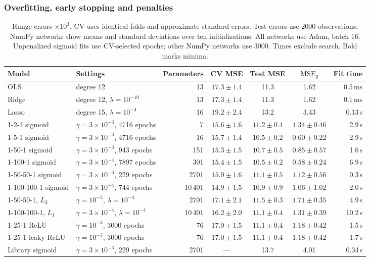 \documentclass[aps,prb,reprint,superscriptaddress,nofootinbib,longbibliography,floatfix]{revtex4-2}
\newcommand{\Mf}{\mathrm{MSE}_{g}}
\begin{document}
\subsubsection{Overfitting, early stopping and penalties}\label{sec:res_penalty}
\begin{table}[!tbp]
\footnotesize
\setlength{\tabcolsep}{4pt}
\centering
\caption{Runge errors $\times10^3$. CV uses identical folds and approximate standard errors. Test errors use 2000 observations; NumPy networks show means and standard deviations over ten initializations. All networks use Adam, batch 16. Unpenalized sigmoid fits use CV-selected epochs; other NumPy networks use 3000. Times exclude search. Bold marks minima.}\label{tab:runge}
\begin{ruledtabular}
\begin{tabular}{llrcccr}
Model & Settings & Parameters & CV MSE & Test MSE & $\Mf$ & Fit time \\ \hline
OLS & degree 12 & 13 & $17.3\pm1.4$ & 11.3 & 1.62 & 0.5\,ms \\
Ridge & degree 12, $\lambda=10^{-10}$ & 13 & $17.3\pm1.4$ & 11.3 & 1.62 & 0.1\,ms \\
Lasso & degree 15, $\lambda=10^{-4}$ & 16 & $19.2\pm2.4$ & 13.2 & 3.43 & 0.13\,s \\[2pt]
1-2-1 sigmoid & $\gamma=3\times10^{-3}$, 4716 epochs & 7 & $15.6\pm1.6$ & $11.2\pm0.4$ & $1.34\pm0.46$ & 2.9\,s \\
1-5-1 sigmoid & $\gamma=3\times10^{-3}$, 4716 epochs & 16 & $15.7\pm1.4$ & $10.5\pm0.2$ & $0.60\pm0.22$ & 2.9\,s \\
1-50-1 sigmoid & $\gamma=3\times10^{-3}$, 943 epochs & 151 & $15.3\pm1.5$ & $10.7\pm0.5$ & $0.85\pm0.57$ & 1.6\,s \\
1-100-1 sigmoid & $\gamma=3\times10^{-4}$, 7897 epochs & 301 & $15.4\pm1.5$ & $\bm{10.5\pm0.2}$ & $\bm{0.58\pm0.24}$ & 6.9\,s \\
1-50-50-1 sigmoid & $\gamma=3\times10^{-3}$, 229 epochs & 2701 & $15.0\pm1.6$ & $11.1\pm0.5$ & $1.12\pm0.56$ & 0.3\,s \\
1-100-100-1 sigmoid & $\gamma=3\times10^{-4}$, 744 epochs & 10\,401 & $\bm{14.9\pm1.5}$ & $10.9\pm0.9$ & $1.06\pm1.02$ & 2.0\,s \\
1-50-50-1, $L_2$ & $\gamma=10^{-3}$, $\lambda=10^{-4}$ & 2701 & $17.1\pm2.1$ & $11.5\pm0.3$ & $1.71\pm0.35$ & 4.9\,s \\
1-100-100-1, $L_1$ & $\gamma=3\times10^{-4}$, $\lambda=10^{-4}$ & 10\,401 & $16.2\pm2.0$ & $11.1\pm0.4$ & $1.31\pm0.39$ & 10.2\,s \\
1-25-1 ReLU & $\gamma=10^{-3}$, 3000 epochs & 76 & $17.0\pm1.5$ & $11.1\pm0.4$ & $1.18\pm0.42$ & 1.5\,s \\
1-25-1 leaky ReLU & $\gamma=10^{-3}$, 3000 epochs & 76 & $17.0\pm1.5$ & $11.1\pm0.4$ & $1.18\pm0.42$ & 1.7\,s \\
Library sigmoid & $\gamma=3\times10^{-3}$, 229 epochs & 2701 & --- & 13.7 & 4.01 & 0.34\,s \\
\end{tabular}
\end{ruledtabular}
\end{table}
\end{document}
